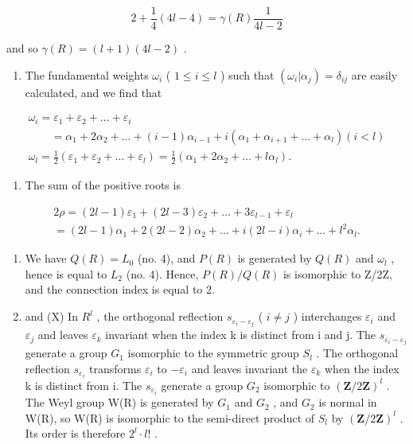 \[
2 + \frac {1}{4} (4 l - 4) = \gamma (R) \frac {1}{4 l - 2}
\]

and so \(\gamma(R) = (l + 1)(4l - 2)\) .

\begin{enumerate}
\def\labelenumi{(\Roman{enumi})}
\setcounter{enumi}{5}
\tightlist
\item
  The fundamental weights \(\omega_{i}\) ( \(1 \leqslant i \leqslant l\) ) such that \((\omega_{i}|\alpha_{j}) = \delta_{ij}\) are easily calculated, and we find that
\end{enumerate}

\[
\begin{array}{l} \omega_ {i} = \varepsilon_ {1} + \varepsilon_ {2} + \dots + \varepsilon_ {i} \\ \qquad = \alpha_ {1} + 2 \alpha_ {2} + \dots + (i - 1) \alpha_ {i - 1} + i (\alpha_ {1} + \alpha_ {i + 1} + \dots + \alpha_ {l}) (i <   l) \\ \omega_ {l} = \frac {1}{2} (\varepsilon_ {1} + \varepsilon_ {2} + \dots + \varepsilon_ {l}) = \frac {1}{2} (\alpha_ {1} + 2 \alpha_ {2} + \dots + l \alpha_ {l}). \end{array}
\]

\begin{enumerate}
\def\labelenumi{(\Roman{enumi})}
\setcounter{enumi}{6}
\tightlist
\item
  The sum of the positive roots is
\end{enumerate}

\[
\begin{array}{l} 2 \rho = (2 l - 1) \varepsilon_ {1} + (2 l - 3) \varepsilon_ {2} + \dots + 3 \varepsilon_ {l - 1} + \varepsilon_ {l} \\ = (2 l - 1) \alpha_ {1} + 2 (2 l - 2) \alpha_ {2} + \dots + i (2 l - i) \alpha_ {i} + \dots + l ^ {2} \alpha_ {l}. \end{array}
\]

\begin{enumerate}
\def\labelenumi{(\Roman{enumi})}
\setcounter{enumi}{7}
\item
  We have \(Q(R) = L_{0}\) (no. 4), and \(P(R)\) is generated by \(Q(R)\) and \(\omega_{l}\) , hence is equal to \(L_{2}\) (no. 4). Hence, \(P(R)/Q(R)\) is isomorphic to Z/2Z, and the connection index is equal to 2.
\item
  and (X) In \(R^{l}\) , the orthogonal reflection \(s_{\varepsilon_{i}-\varepsilon_{j}}\) ( \(i \neq j\) ) interchanges \(\varepsilon_{i}\) and \(\varepsilon_{j}\) and leaves \(\varepsilon_{k}\) invariant when the index k is distinct from i and j. The \(s_{\varepsilon_{i}-\varepsilon_{j}}\) generate a group \(G_{1}\) isomorphic to the symmetric group \(S_{l}\) . The orthogonal reflection \(s_{\varepsilon_{i}}\) transforms \(\varepsilon_{i}\) to \(-\varepsilon_{i}\) and leaves invariant the \(\varepsilon_{k}\) when the index k is distinct from i. The \(s_{\varepsilon_{i}}\) generate a group \(G_{2}\) isomorphic to \((\mathbf{Z}/2\mathbf{Z})^{l}\) . The Weyl group W(R) is generated by \(G_{1}\) and \(G_{2}\) , and \(G_{2}\) is normal in W(R), so W(R) is isomorphic to the semi-direct product of \(S_{l}\) by \((\mathbf{Z}/2\mathbf{Z})^{l}\) . Its order is therefore \(2^{l}\cdot l!\) .
\end{enumerate}


